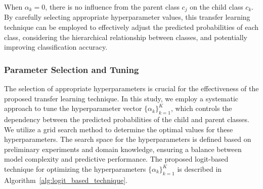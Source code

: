 \documentclass[review,1p,times,numbers]{elsarticle}
\begin{document}
When $\alpha_k=0 $, there is no influence from the parent class $c_j$ on the child class $c_k$.  By carefully selecting appropriate hyperparameter values, this transfer learning technique can be employed to effectively adjust the predicted probabilities of each class, considering the hierarchical relationship between classes, and potentially improving classification accuracy.

\subsubsection{Parameter Selection and Tuning}
The selection of appropriate hyperparameters is crucial for the effectiveness of the proposed transfer learning technique. In this study, we employ a systematic approach to tune the hyperparameter vector ${\{\alpha_k \}}_{k=1}^K$, which controls the dependency between the predicted probabilities of the child and parent classes. We utilize a grid search method to determine the optimal values for these hyperparameters. The search space for the hyperparameters is defined based on preliminary experiments and domain knowledge, ensuring a balance between model complexity and predictive performance. The proposed logit-based technique for optimizing the hyperparameters $\{\alpha_k\}_{k=1}^K$ is described in Algorithm~\ref{alg:logit_based_technique}.
\end{document}
